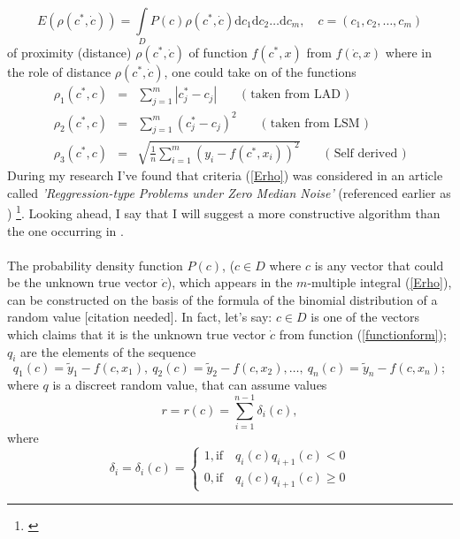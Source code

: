 \begin{equation}
E(\rho(c^{*},\dot{c}))= \int\limits_{D}P(c)\rho(c^{*},\dot{c})\mathrm{d}c_{1}\mathrm{d}c_{2}\dots \mathrm{d}c_{m}, \quad c = (c_{1},c_{2},\dots,c_{m}) \label{Erho}
\end{equation}
of proximity (distance) $\rho(c^{*},\dot{c})$ of function $f(c^{*},x)$ from $f(\dot{c},x)$ where in the role of distance $\rho(c^{*},\dot{c})$, one could take on of the functions
\begin{eqnarray}
\rho_{1}(c^{*},c) &=& \sum\limits_{j=1}^{m} \left| c_{j}^{*}-c_{j} \right| \label{rho1} \qquad \text{( taken from LAD )}\\
\rho_{2}(c^{*},c) &=& \sum\limits_{j=1}^{m} \left( c_{j}^{*}-c_{j} \right)^{2} \label{rho2} \qquad \text{( taken from LSM )}\\
\rho_{3}(c^{*},c) &=& \sqrt{\frac{1}{n}\sum\limits_{i=1}^{m} \left( y_{i}-f(c^{*},x_{i}) \right)^{2}} \label{rho3} \qquad \text{( Self derived )}
\end{eqnarray}
During my research I've found that criteria (\ref{Erho}) was considered in an article called \textit{'Reggression-type Problems under Zero Median Noise'} (referenced earlier as \citep{balk_2010}) \footnote{\cite{balk_2010}}. Looking ahead, I say that I will suggest a more constructive algorithm than the one occurring in \citep{balk_2010}.\\
\\
The probability density function $P(c)$, ($c \in D$ where $c$ is any vector that could be the unknown true vector $\dot{c}$), which appears in the $m$-multiple integral (\ref{Erho}), can be constructed on the basis of the formula of the binomial distribution of a random value [citation needed]. In fact, let's say: $c \in D$ is one of the vectors which claims that it is the unknown true vector $ \dot{c}$ from function (\ref{functionform}); $q_{i}$ are the elements of the sequence
\begin{equation}
q_{1}(c)=\tilde{y}_{1}-f(c,x_{1}),\ q_{2}(c)=\tilde{y}_{2}-f(c,x_{2}), \dots, \ q_{n}(c)=\tilde{y}_{n}-f(c,x_{n}); \label{sequence}
\end{equation}
where $q$ is a discreet random value, that can assume values
\begin{equation}
r=r(c)=\sum\limits_{i=1}^{n-1} \delta_{i}(c), \label{eq-values-of-q}
\end{equation}
where
\begin{equation}
\delta_{i}=\delta_{i}(c)=
\begin{cases} 
      1, \mathrm{if} \quad q_{i}(c)q_{i+1}(c)<0\\
      0, \mathrm{if} \quad q_{i}(c)q_{i+1}(c)\geq 0
   \end{cases}
\end{equation}
